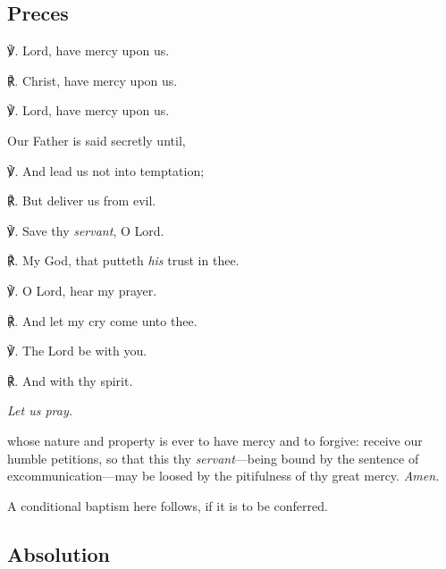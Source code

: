 \vspace{-0.5\baselineskip}

\subsection{Preces}

\vspace{-0.25\baselineskip}

℣. Lord, have mercy upon us.

℟. Christ, have mercy upon us.

℣. Lord, have mercy upon us.

\begin{rubric}
    Our Father is said secretly until,
\end{rubric}
℣. And lead us not into temptation;

℟. But deliver us from evil.

℣. Save thy \textit{servant}, O Lord.

℟. My God, that putteth \textit{his} trust in thee.

℣. O Lord, hear my prayer.

℟. And let my cry come unto thee.

℣. The Lord be with you.

℟. And with thy spirit.

\centerline{\textit{Let us pray.}}

 whose nature and property is ever to have mercy and to forgive: receive our humble petitions, so that this thy \textit{servant}---being bound by the sentence of excommunication---may be loosed by the pitifulness of thy great mercy. \textit{Amen.}

\begin{rubric}
    A conditional baptism here follows, if it is to be conferred.
\end{rubric}

\vspace{-0.5\baselineskip}

\subsection{Absolution}

